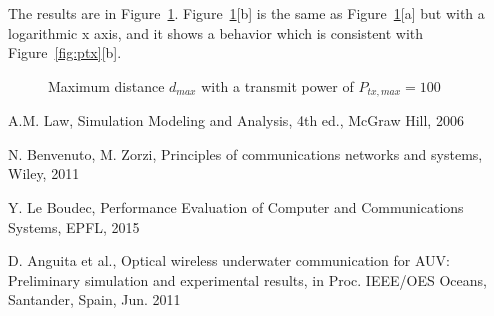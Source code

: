 \documentclass[10pt]{article}
\begin{document}
The results are in Figure~\ref{fig:dmax}. Figure~\ref{fig:dmax}[b] is the same as Figure~\ref{fig:dmax}[a] but with a logarithmic x axis, and it shows a behavior which is consistent with Figure~\ref{fig:ptx}[b].

\begin{figure}[h!]
	\centering
	\caption{Maximum distance $d_{max}$ with a transmit power of $P_{tx, max} = 100$}
	\label{fig:dmax}
\end{figure}


\begin{thebibliography}{10}

A.M. Law, Simulation Modeling and Analysis, 4th ed., McGraw Hill, 2006

N. Benvenuto, M. Zorzi, Principles of communications networks and systems, Wiley, 2011

Y. Le Boudec, Performance Evaluation of Computer and Communications Systems, EPFL, 2015

D. Anguita et al., Optical wireless underwater communication for AUV: Preliminary simulation and experimental results, in Proc. IEEE/OES Oceans, Santander, Spain, Jun. 2011

\end{thebibliography}
\end{document}
